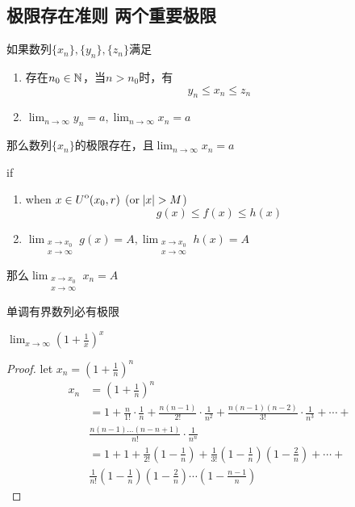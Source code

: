 \documentclass[11pt]{article}
\begin{document}
\subsection{极限存在准则 两个重要极限}
\label{sec:org151a53a}
\begin{proposition}[]
如果数列\(\{x_n\},\{y_n\},\{z_n\}\)满足
\begin{enumerate}
\item 存在\(n_0\in\mathbb{N}\)，当\(n>n_0\)时，有
\begin{equation*}
y_n\le x_n\le z_n
\end{equation*}
\item \(\lim_{n\to\infty}y_n=a,\lim_{n\to\infty}x_n=a\)
\end{enumerate}


那么数列\(\{x_n\}\)的极限存在，且\(\lim_{n\to\infty}x_n=a\)
\end{proposition}

\begin{proposition}[]
if
\begin{enumerate}
\item when \(x\in{\kern0ptU}^{\mathrm{o}}(x_0,r)\) (or \(\abs{x}>M\))
\begin{equation*}
g(x)\le f(x)\le h(x)
\end{equation*}
\item \(\lim_{\substack{x\to x_0\\x\to\infty}}g(x)=A,\lim_{\substack{x\to
      x_0\\x\to \infty}}h(x)=A\)
\end{enumerate}


那么\(\lim_{\substack{x\to x_0\\x\to\infty}}x_n=A\)
\end{proposition}

\begin{proposition}[]
单调有界数列必有极限
\end{proposition}

\begin{corollary}[]
\(\lim_{x\to\infty}(1+\frac{1}{x})^x\)
\end{corollary}

\begin{proof}
let \(x_n=(1+\frac{1}{n})^n\)
\begin{align*}
x_n&=(1+\frac{1}{n})^n\\
&=1+\frac{n}{1!}\cdot\frac{1}{n}+\frac{n(n-1)}{2!}\cdot\frac{1}{n^2}+
\frac{n(n-1)(n-2)}{3!}\cdot\frac{1}{n^3}+\cdots+\\
&\frac{n(n-1)\dots(n-n+1)}{n!}\cdot\frac{1}{n^n}\\
&=1+1+\frac{1}{2!}(1-\frac{1}{n})+\frac{1}{3!}(1-\frac{1}{n})(1-\frac{2}{n})+\cdots+\\
&\frac{1}{n!}(1-\frac{1}{n})(1-\frac{2}{n})\cdots(1-\frac{n-1}{n})
\end{align*}
\end{proof}
\end{document}

